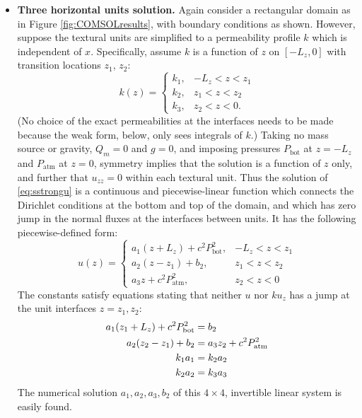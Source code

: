 \documentclass[11pt]{amsart}
\newcommand{\Patm}{P_{\text{atm}}}
\newcommand{\Pbot}{P_{\text{bot}}}
\begin{document}
\begin{itemize}
\item \textbf{Three horizontal units solution.}  Again consider a rectangular domain as in Figure \ref{fig:COMSOLresults}, with boundary conditions as shown.  However, suppose the textural units are simplified to a permeability profile $k$ which is independent of $x$.  Specifically, assume $k$ is a function of $z$ on $[-L_z,0]$ with transition locations $z_1$, $z_2$:
\begin{equation}
k(z) = \begin{cases} k_1, & -L_z < z < z_1 \\
                     k_2, & z_1 < z < z_2 \\
                     k_3, & z_2 < z < 0. \end{cases}
\end{equation}
(No choice of the exact permeabilities at the interfaces needs to be made because the weak form, below, only sees integrals of $k$.)  Taking no mass source or gravity, $Q_m=0$ and $g=0$, and imposing pressures $\Pbot$ at $z=-L_z$ and $\Patm$ at $z=0$, symmetry implies that the solution is a function of $z$ only, and further that $u_{zz}=0$ within each textural unit.  Thus the solution of \eqref{eq:sstrongu} is a continuous and piecewise-linear function which connects the Dirichlet conditions at the bottom and top of the domain, and which has zero jump in the normal fluxes at the interfaces between units.  It has the following piecewise-defined form:
\begin{equation}
u(z) = \begin{cases} a_1 (z + L_z) + c^2 \Pbot^2, & -L_z < z < z_1 \\
                     a_2 (z - z_1) + b_2, & z_1 < z < z_2 \\
                     a_3 z + c^2 \Patm^2, & z_2 < z < 0 \end{cases} \label{eq:threehor}
\end{equation}
The constants satisfy equations stating that neither $u$ nor $k u_z$ has a jump at the unit interfaces $z=z_1,z_2$:
\begin{align}
a_1 (z_1+L_z) + c^2 \Pbot^2 &= b_2 \label{eq:threehor:linsysconstants} \\
a_2 (z_2-z_1) + b_2 &= a_3 z_2 + c^2 \Patm^2 \notag \\
k_1 a_1 &= k_2 a_2 \notag \\
k_2 a_2 &= k_3 a_3 \notag
\end{align}
The numerical solution $a_1,a_2,a_3,b_2$ of this  $4\times 4$, invertible linear system is easily found.
\end{itemize}
\end{document}
